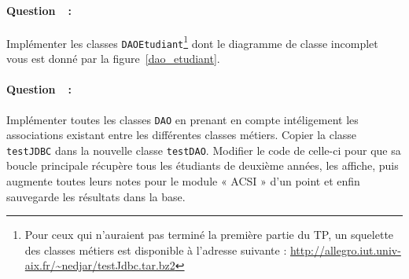 \documentclass[a4paper,11pt]{article}
\newcounter{compteurQuestion}
\newcommand{\Question}{\paragraph*{Question~\thecompteurQuestion~:}\addtocounter{compteurQuestion}{1}}
\begin{document}
\Question
Implémenter les classes \texttt{DAOEtudiant}\footnote{Pour ceux qui n'auraient pas terminé la première partie du TP, un 
squelette des classes métiers est disponible à l'adresse suivante : \url{http://allegro.iut.univ-aix.fr/~nedjar/testJdbc.tar.bz2}} 
dont le diagramme de classe incomplet vous est donné par la figure~\ref{dao_etudiant}. 
\Question
Implémenter toutes les classes \texttt{DAO} en prenant en compte intéligement les associations existant entre les 
différentes classes métiers. Copier la classe \texttt{testJDBC} dans la nouvelle classe \texttt{testDAO}. Modifier le 
code de celle-ci pour que sa boucle principale récupère tous les étudiants de deuxième années, les affiche, puis 
augmente toutes leurs notes pour le module « ACSI » d'un point et enfin sauvegarde les résultats dans la base.



\end{document}
